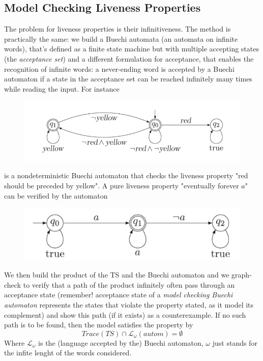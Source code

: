\documentclass{article}
\begin{document}
			\subsection{Model Checking Liveness Properties}
				The problem for liveness properties is their infinitiveness. The method is practically the same: we build a Buechi automata (an automata on infinite words), that's defined as a finite state machine but with multiple accepting states (the \emph{acceptance set}) and a different formulation for acceptance, that enables the recognition of infinite words: a never-ending word is accepted by a Buechi automaton if a state in the acceptance set can be reached infinitely many times while reading the input. For instance
				\begin{figure}[H]
					\centering
					\includegraphics[width = \textwidth]{./images/NBA.png}
				\end{figure}
				is a nondeterministic Buechi automaton that checks the liveness property "red should be preceded by yellow". A pure liveness property "eventually forever $a$" can be verified by the automaton
				\begin{figure}[H]
					\centering
					\includegraphics[width = \textwidth]{./images/NBA2.png}
				\end{figure}
				We then build the product of the TS and the Buechi automaton and we graph-check to verify that a path of the product infinitely often pass through an acceptance state (remember! acceptance state of a \emph{model checking Buechi automaton} represents the states that violate the property stated, as it model its complement) and show this path (if it exists) as a counterexample. If no such path is to be found, then the model satisfies the property by
				\begin{equation}
					Trace(TS) \cap \mathcal{L}_{\omega}(autom) = \emptyset
				\end{equation}
				Where $\mathcal{L}_{\omega}$ is the (language accepted by the) Buechi automaton, $\omega$ just stands for the infite lenght of the words considered.
		
\end{document}
